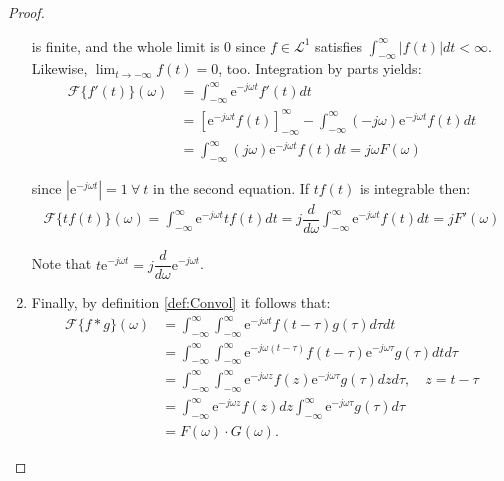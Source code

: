 \begin{proof}
\begin{enumerate}[label=(\alph*)]
is finite, and the whole limit is 0 since $f \in \mathcal{L}^1$ satisfies $\int_{-\infty}^\infty |f(t)| dt < \infty$. Likewise, $\displaystyle{\lim_{t \to -\infty} f(t) = 0}$, too. Integration by parts yields:
\begin{align*}
\mathcal{F}\{f'(t)\}(\omega) &= \int_{-\infty}^\infty \text{e}^{-j \omega t} f'(t) dt \\
&= \left[ \text{e}^{-j\omega t} f(t) \right]_{-\infty}^\infty - \int_{-\infty}^\infty (-j \omega) \text{e}^{-j \omega t} f(t) dt \\
&= \int_{-\infty}^\infty (j \omega) \text{e}^{-j \omega t} f(t) dt = j\omega F(\omega)
\end{align*}

since $|\text{e}^{-j\omega t}| = 1 \ \forall \ t$ in the second equation. If $tf(t)$ is integrable then:
\begin{align*}
\mathcal{F}\{tf(t)\}(\omega) = \int_{-\infty}^\infty \text{e}^{-j \omega t} t f(t) dt = j \dfrac{d}{d\omega} \int_{-\infty}^\infty \text{e}^{-j \omega t} f(t) dt = j F'(\omega)
\end{align*}

Note that $t \text{e}^{-j \omega t} = j \dfrac{d}{d\omega} \text{e}^{-j\omega t}$.

\item Finally, by definition \ref{def:Convol} it follows that:
\begin{align*}
\mathcal{F}\{f*g\}(\omega) &= \int_{-\infty}^\infty \int_{-\infty}^\infty \text{e}^{-j \omega t} f(t - \tau) g(\tau) d\tau dt \\
&= \int_{-\infty}^\infty \int_{-\infty}^\infty \text{e}^{-j\omega(t-\tau)} f(t-\tau) \text{e}^{-j\omega \tau} g(\tau) dt d\tau \\
&= \int_{-\infty}^\infty \int_{-\infty}^\infty \text{e}^{-j\omega z} f(z) \text{e}^{-j\omega \tau} g(\tau) dz d\tau, \quad z = t - \tau \\
&= \int_{-\infty}^\infty \text{e}^{-j\omega z} f(z) dz \int_{-\infty}^\infty \text{e}^{-j\omega \tau} g(\tau) d\tau \\
&= F(\omega) \cdot G(\omega).
\end{align*}
\end{enumerate}
\end{proof}


